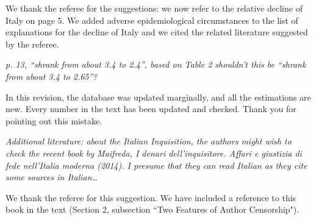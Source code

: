 \documentclass[12pt]{article}
\begin{document}
We thank the referee for the suggestions: we now refer to the relative decline of Italy on page 5. We added adverse epidemiological circumstances to the list of explanations for the decline of Italy and we cited the related literature suggested by the referee.

\textit{
p. 13, “shrank from about 3.4 to 2.4”, based on Table 2 shouldn’t this be “shrank from about 3.4 to 2.65”?
}

In this revision, the database was updated marginally, and all the estimations are new. Every number in the text has been updated and checked. Thank you for pointing out this mistake.

\textit{
Additional literature: about the Italian Inquisition, the authors might wish to check the recent book by Maifreda, I denari dell'inquisitore. Affari e giustizia di fede nell'Italia moderna (2014). I presume that they can read Italian as they cite some sources in Italian…
}

We thank the referee for this suggestion. We have included a reference to this book in the text (Section 2, subsection ``Two Features of Author Censorship").



\end{document}
